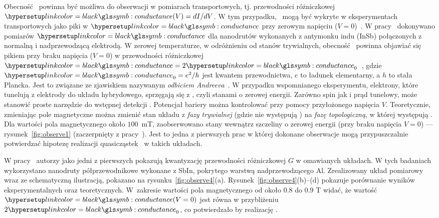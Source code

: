 Obecność \MZM\ powinna być możliwa do obserwacji w pomiarach transportowych, tj. przewodności różniczkowej $\conductance (V) = dI/dV$.
W tym przypadku, \MZM\ mogą być wykryte w eksperymentach transportowych jako piki w $\conductance$ przy zerowym napięciu ($V=0$)~\cite{mourik.zuo.2012}.
W pracy~\cite{mourik.zuo.2012} dokonywano pomiarów $\conductance$ dla nanodrutów wykonanych z antymonku indu (InSb) połączonych z normalną i nadprzewodzącą elektrodą.
W zerowej temperaturze, w odróżnieniu od stanów trywialnych, obecność \MZM\ powinna objawiać się pikiem przy braku napięcia ($V=0$) w przewodności różniczkowej $\conductance = 2 \conductance_0$~\cite{flensberg.2010,prada.san-jose.2012,stanescu.tewari.2012,liu.potter.2012,rainis.trifunovic.2013,lutchyn.bakkers.2018}, gdzie $\conductance_0=e^2/h$ jest kwantem przewodnictwa, $e$ to ładunek elementarny, a $h$ to stała Plancka.
Jest to związane ze zjawiskiem nazywanym \textit{odbiciem Andreeva}~\cite{law.lee.2009,he.ng.2014}.
W przypadku wspomnianego eksperymentu, elektrony, które tunelują z elektrody do układu hybrydowego, sprzęgają się z \MZM, czyli stanami o zerowej energii.
Zarówno spin jak i prąd tunelowy, może stanowić proste narzędzie do wstępnej detekcji \MZM.
Potencjał bariery można kontrolować przy pomocy przyłożonego napięcia $V$.
Teoretycznie, zmieniając pole magnetyczne można zmienić stan układu z \textit{fazy trywialnej} (gdzie nie występują \MZM) na \textit{fazę topologiczną}, w której występują \MZM.
Dla wartości pola magnetycznego około $100$~mT, zaobserwowano stany wewnątrz szczeliny o zerowej energii (przy braku napięcia $V=0$) ---  rysunek~\ref{fig:observe1} (zaczerpnięty z pracy~\cite{mourik.zuo.2012}).
Jest to jedna z pierwszych prac w której dokonane obserwacje mogą przypuszczalnie potwierdzać hipotezę realizacji quasicząstek \MZM\ w takich układach.


W pracy~\cite{zhang.liu.2018} autorzy jako jedni z pierwszych pokazują kwantyzację przewodności różniczkowej $G$ w omawianych układach.
W tych badaniach wykorzystano nanodruty półprzewodnikowe wykonane z SbIn, pokrytego warstwą nadprzewodzącego Al.
Zrealizowany układ pomiarowy wraz ze schematyczną ilustracją, pokazano na rysunku~\ref{fig:observe4}(a).
Rysunek~\ref{fig:observe4}(b)--(d) pokazuje porównanie wyników eksperymentalnych oraz teoretycznych.
W~zakresie wartości pola magnetycznego od około $0.8$ do $0.9$ T widać, że wartość $\conductance (V=0)$ jest równa w przybliżeniu $2 \conductance_0$, co potwierdzało by realizację \MZM.


